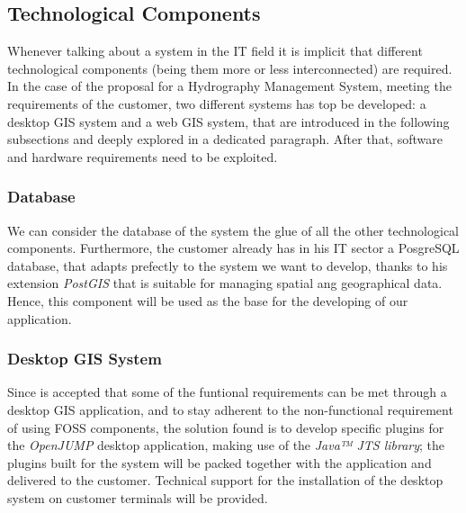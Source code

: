 \subsection{Technological Components}
Whenever talking about a system in the IT field it is implicit that different technological components (being them more or less interconnected) are required. In the case of the proposal for a Hydrography Management System, meeting the requirements of the customer, two different systems has top be developed: a desktop GIS system and a web GIS system, that are introduced in the following subsections and deeply explored in a dedicated paragraph. After that, software and hardware requirements need to be exploited.

\subsubsection{Database}
We can consider the database of the system the glue of all the other technological components. Furthermore, the customer already has in his IT sector a PosgreSQL database, that adapts prefectly to the system we want to develop, thanks to his extension \textit{PostGIS} that is suitable for managing spatial ang geographical data. Hence, this component will be used as the base for the developing of our application.
\subsubsection{Desktop GIS System}
Since is accepted that some of the funtional requirements can be met through a desktop GIS application, and to stay adherent to the non-functional requirement of using FOSS components, the solution found is to develop specific plugins for the \textit{OpenJUMP} desktop application, making use of the \textit{Java™ JTS library}; the plugins built for the system will be packed together with the application and delivered to the customer. Technical support for the installation of the desktop system on customer terminals will be provided.
